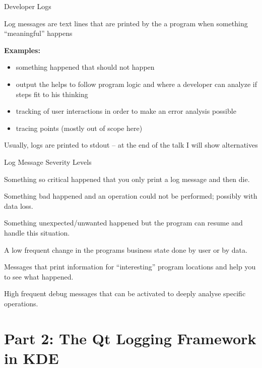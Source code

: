 \documentclass[t,compress,aspectratio=169]{beamer}
\begin{document}
\begin{frame}
    {Developer Logs}

    Log messages are text lines that are printed by the a program when something ``meaningful'' happens
    \medskip

    \textbf{Examples:}
    \begin{itemize}
        \item something happened that should not happen
        \item output the helps to follow program logic and where a developer can analyze if steps fit to his thinking
        \item tracking of user interactions in order to make an error analysis possible
        \item tracing points (mostly out of scope here)
    \end{itemize}
    \medskip

    Usually, logs are printed to stdout -- at the end of the talk I will show alternatives
\end{frame}

\begin{frame}
    {Log Message Severity Levels}

    \begin{description}
        \item[Fatal] Something so critical happened that you only print a log message and then die.
        \item<2->[Critical] Something bad happened and an operation could not be performed; possibly with data loss.
        \item<3->[Warning] Something unexpected/unwanted happened but the program can resume and handle this situation.
        \item<4->[Info] A low frequent change in the programs business state done by user or by data.
        \item<5->[Debug] Messages that print information for ``interesting'' program locations and help you to see what happened.
        \item<6->[Trace] High frequent debug messages that can be activated to deeply analyse specific operations.
    \end{description}
\end{frame}

\section{Part 2: The Qt Logging Framework in KDE}
\end{document}
